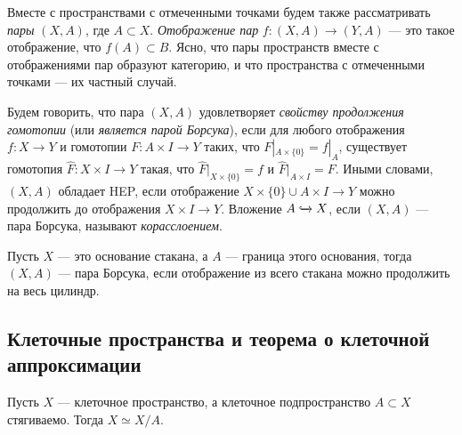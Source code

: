 Вместе с пространствами с отмеченными точками будем также рассматривать \textit{пары} $(X, A)$, где $A\subset X$. \textit{Отображение пар} $f\colon (X,A)\to (Y,A)$ --- это такое отображение, что $f(A)\subset B$. Ясно, что пары пространств вместе с отображениями пар образуют категорию, и что пространства с отмеченными точками --- их частный случай.

Будем говорить, что пара $(X,A)$ удовлетворяет \textit{свойству продолжения гомотопии} (или \textit{является парой Борсука}), если для любого отображения $f\colon X\to Y$ и гомотопии $F\colon A\times I\to Y$ таких, что $F|_{A\times\{0\}}=f|_A$, существует гомотопия $\hat{F}\colon X\times I\to Y$ такая, что $\hat{F}|_{X\times\{0\}}=f$ и $\hat{F}|_{A\times I}=F$. Иными словами, $(X,A)$ обладает HEP, если отображение $X\times\{0\}\cup A\times I\to Y$ можно продолжить до отображения $X\times I\to Y$. Вложение $A\xhookrightarrow{} X$, если  $(X,A)$ --- пара Борсука, называют \textit{корасслоением}.

Пусть $X$ --- это основание стакана, а $A$ --- граница этого основания, тогда $(X,A)$ --- пара Борсука, если отображение из всего стакана можно продолжить на весь цилиндр.

\subsection{Клеточные пространства и теорема о клеточной аппроксимации}
\begin{prop}
	Пусть $X$ --- клеточное пространство, а клеточное подпространство $A\subset X$ стягиваемо. Тогда $X\simeq X/A$.
\end{prop}